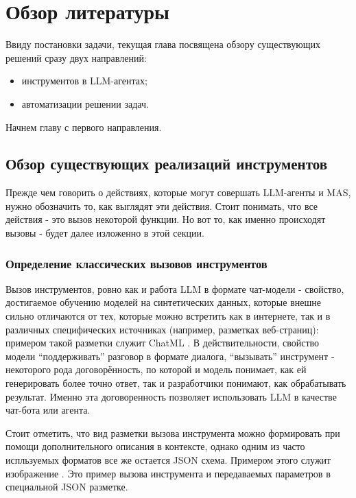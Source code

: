 \chapter{Обзор литературы} \label{ch2}

Ввиду постановки задачи, текущая глава посвящена обзору существующих решений 
сразу двух направлений:
\begin{itemize}
    \item инструментов в LLM-агентах;
    \item автоматизации решении задач.
\end{itemize}

Начнем главу с первого направления.

\section{Обзор существующих реализаций инструментов} \label{ch2:sec1}

Прежде чем говорить о действиях, которые могут совершать LLM-агенты и MAS, нужно обозначить
то, как выглядят эти действия. Стоит понимать, что все действия - это вызов 
некоторой функции. Но вот то, как именно происходят вызовы - будет далее изложенно 
в этой секции.

\subsection{Определение классических вызовов инструментов} \label{ch2:sec1:subsec1}

Вызов инструментов, ровно как и работа LLM в формате чат-модели - свойство, достигаемое
обучению моделей на синтетических данных, которые внешне сильно отличаются от тех,
которые можно встретить как в интернете, так и в различных специфических источниках 
(например, разметках веб-страниц): примером такой разметки служит ChatML \cite{chatml}. В действительности, свойство модели 
``поддерживать'' разговор в формате диалога, ``вызывать'' инструмент - некоторого рода 
договорённость, по которой и модель понимает, как ей генерировать более точно ответ,
так и разработчики понимают, как обрабатывать результат. Именно эта договоренность
позволяет использовать LLM в качестве чат-бота или агента.

Стоит отметить, что вид разметки вызова инструмента можно 
формировать при помощи дополнительного описания в контексте, однако одним из часто испльзуемых
форматов все же остается JSON схема. Примером этого служит изображение . 
Это пример вызова инструмента и передаваемых параметров в специальной JSON разметке.

